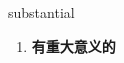 
\begin{frame}
{\huge substantial}
\begin{center}
\begin{enumerate}\Large
  \item \textbf{有重大意义的}
\end{enumerate}
\end{center}
\end{frame}
